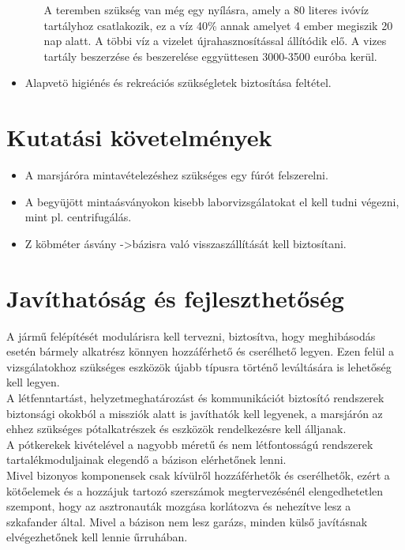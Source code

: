 \documentclass[12pt]{report}
\begin{document}
\begin{itemize}
\begin{itemize}
    A teremben szükség van még egy nyílásra, amely a 80 literes ivóvíz tartályhoz csatlakozik, ez a víz 40\% annak amelyet 4 ember megiszik 20 nap alatt. A többi víz a vizelet újrahasznosítással állítódik elő. A vizes tartály beszerzése és beszerelése eggyüttesen 3000-3500 euróba kerül.  
  \end{itemize}  
  \item Alapvetö higiénés és rekreációs szükségletek biztosítása feltétel.
\end{itemize}
\section{Kutatási követelmények}
\begin{itemize}
  \item A marsjáróra mintavételezéshez szükséges egy fúrót felszerelni.
  \item A begyüjött mintaásványokon kisebb laborvizsgálatokat el kell tudni végezni, mint pl. centrifugálás.
  \item Z köbméter ásvány ->bázisra való visszaszállítását kell biztosítani.
\end{itemize}


\section{Javíthatóság és fejleszthetőség}

A jármű felépítését modulárisra kell tervezni, biztosítva, hogy meghibásodás esetén bármely alkatrész könnyen hozzáférhető és cserélhető legyen. Ezen felül a vizsgálatokhoz szükséges eszközök újabb típusra történő leváltására is lehetőség kell legyen. \\
A létfenntartást, helyzetmeghatározást és kommunikációt biztosító rendszerek biztonsági okokból a missziók alatt is javíthatók kell legyenek, a marsjárón az ehhez szükséges pótalkatrészek és eszközök rendelkezésre kell álljanak. \\
A pótkerekek kivételével a nagyobb méretű és nem létfontosságú rendszerek tartalékmoduljainak elegendő a bázison elérhetőnek lenni. \\
Mivel bizonyos komponensek csak kívülről hozzáférhetők és cserélhetők, ezért a kötőelemek és a hozzájuk tartozó szerszámok megtervezésénél elengedhetetlen szempont, hogy az asztronauták mozgása korlátozva és nehezítve lesz a szkafander által. Mivel a bázison nem lesz garázs, minden külső javításnak elvégezhetőnek kell lennie űrruhában.
\end{document}
